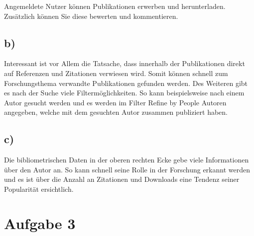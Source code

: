 \documentclass[11pt,a4paper,parskip=half ]{scrartcl}
\begin{document}
	Angemeldete Nutzer können Publikationen erwerben und herunterladen. Zusätzlich können Sie diese bewerten und kommentieren. 	
	
	\subsection*{b)}
	Interessant ist vor Allem die Tatsache, dass innerhalb der Publikationen direkt auf Referenzen und Zitationen verwiesen wird. Somit können schnell zum Forschungsthema verwandte Publikationen gefunden werden. Des Weiteren gibt es nach der Suche viele Filtermöglichkeiten. So kann beispielsweise nach einem Autor gesucht werden und es werden im Filter \glqq{}Refine by People\grqq{} Autoren angegeben, welche mit dem gesuchten Autor zusammen publiziert haben.
	
	\subsection*{c)}
	Die bibliometrischen Daten in der oberen rechten Ecke gebe viele Informationen über den Autor an. So kann schnell seine Rolle in der Forschung erkannt werden und es ist über die Anzahl an Zitationen und Downloads eine Tendenz seiner Popularität ersichtlich.
	
	\section*{Aufgabe 3}
\end{document}
